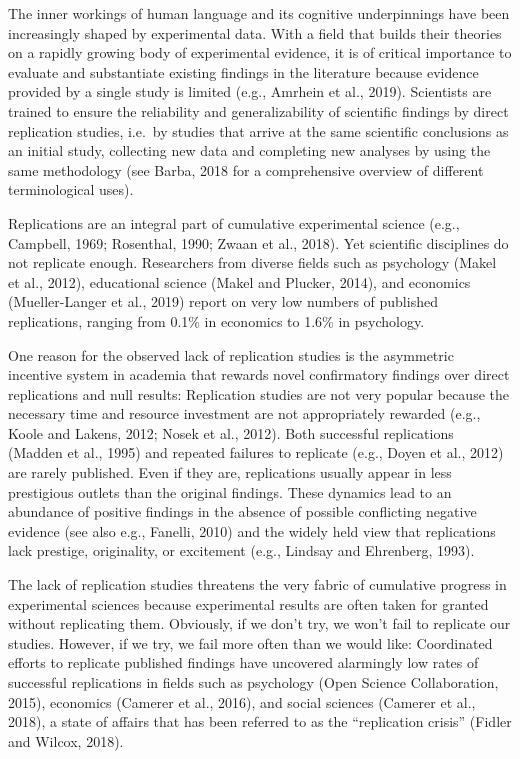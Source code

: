 \documentclass[]{elsarticle} %
\begin{document}
The inner workings of human language and its cognitive underpinnings have been increasingly shaped by experimental data. With a field that builds their theories on a rapidly growing body of experimental evidence, it is of critical importance to evaluate and substantiate existing findings in the literature because evidence provided by a single study is limited (e.g., Amrhein et al., 2019). Scientists are trained to ensure the reliability and generalizability of scientific findings by direct replication studies, i.e.~by studies that arrive at the same scientific conclusions as an initial study, collecting new data and completing new analyses by using the same methodology (see Barba, 2018 for a comprehensive overview of different terminological uses).

Replications are an integral part of cumulative experimental science (e.g., Campbell, 1969; Rosenthal, 1990; Zwaan et al., 2018). Yet scientific disciplines do not replicate enough. Researchers from diverse fields such as psychology (Makel et al., 2012), educational science (Makel and Plucker, 2014), and economics (Mueller-Langer et al., 2019) report on very low numbers of published replications, ranging from 0.1\% in economics to 1.6\% in psychology.

One reason for the observed lack of replication studies is the asymmetric incentive system in academia that rewards novel confirmatory findings over direct replications and null results: Replication studies are not very popular because the necessary time and resource investment are not appropriately rewarded (e.g., Koole and Lakens, 2012; Nosek et al., 2012). Both successful replications (Madden et al., 1995) and repeated failures to replicate (e.g., Doyen et al., 2012) are rarely published. Even if they are, replications usually appear in less prestigious outlets than the original findings. These dynamics lead to an abundance of positive findings in the absence of possible conflicting negative evidence (see also e.g., Fanelli, 2010) and the widely held view that replications lack prestige, originality, or excitement (e.g., Lindsay and Ehrenberg, 1993).

The lack of replication studies threatens the very fabric of cumulative progress in experimental sciences because experimental results are often taken for granted without replicating them. Obviously, if we don't try, we won't fail to replicate our studies. However, if we try, we fail more often than we would like: Coordinated efforts to replicate published findings have uncovered alarmingly low rates of successful replications in fields such as psychology (Open Science Collaboration, 2015), economics (Camerer et al., 2016), and social sciences (Camerer et al., 2018), a state of affairs that has been referred to as the ``replication crisis'' (Fidler and Wilcox, 2018).
\end{document}
